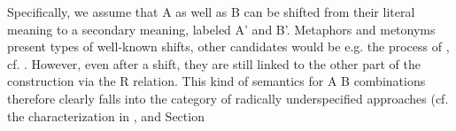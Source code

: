 \documentclass[a4paper,12pt,oneside]{book}
\begin{document}
Specifically, we assume that
A as well as B can be shifted from their literal meaning to a
secondary meaning, labeled A' and B'. 
Metaphors and metonyms present
types of well-known shifts, other candidates would be e.g. the process
of , cf. \citet{Bierwisch:1982}.
However, even after a shift,
they are still linked to the other part of the construction via the R
relation. This kind of semantics for A B combinations therefore clearly falls
into the category of radically underspecified approaches (cf. the
characterization in \citealt[128]{Blutner:1998}, and Section 
\end{document}
